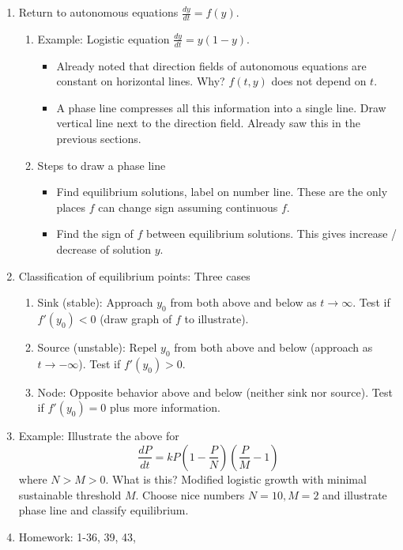 \documentclass{article}
\newcommand{\ds}{\displaystyle}
\begin{document}
\begin{enumerate}

\item Return to autonomous equations $\ds \frac{dy}{dt} = f(y)$. 
\begin{enumerate}
\item Example: Logistic equation $\ds \frac{dy}{dt}=y(1-y)$. 
\begin{itemize}
\item Already noted that direction fields of autonomous equations are constant on horizontal lines. Why? $f(t,y)$ does not depend on $t$.
\item A phase line compresses all this information into a single line. Draw vertical line next to the direction field. Already saw this in the previous sections.
\end{itemize} 
\item Steps to draw a phase line
\begin{itemize}
\item Find equilibrium solutions, label on number line. These are the only places $f$ can change sign assuming continuous $f$.
\item Find the sign of $f$ between equilibrium solutions. This gives increase / decrease of solution $y$.
\end{itemize} 
\end{enumerate}


\item Classification of equilibrium points: Three cases
\begin{enumerate}
\item Sink (stable): Approach $y_0$ from both above and below as $t \rightarrow \infty$. Test if $f'(y_0)<0$ (draw graph of $f$ to illustrate). 
\item Source (unstable): Repel $y_0$ from both above and below (approach as $t \rightarrow -\infty$).  Test if $f'(y_0)>0$.
\item Node: Opposite behavior above and below (neither sink nor source).  Test if $f'(y_0)=0$ plus more information.
\end{enumerate}

\item Example: Illustrate the above for
\[
\frac{dP}{dt} = kP\left(1-\frac{P}{N}\right)\left(\frac{P}{M}-1\right)\]
where $N>M>0$. What is this? Modified logistic growth with minimal sustainable threshold $M$. Choose nice numbers $N=10, M=2$ and illustrate phase line and classify equilibrium. 

\item Homework: 1-36, 39, 43, 

\end{enumerate}
\end{document}
